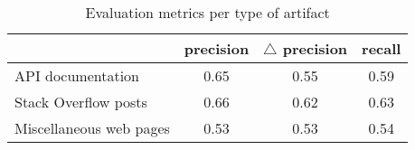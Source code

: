 \begin{table}
\caption{Evaluation metrics per type of artifact}
\label{tbl:comparison-artifact-type-wise}
\centering    
\begin{threeparttable}
\begin{tabular}{lccc}




& \textbf{precision} & $\triangle$ \textbf{precision} & \textbf{recall} \\ 
\hline

API documentation & 0.65 & 0.55 & 0.59
\\

Stack Overflow posts  & 0.66 & 0.62 & 0.63
\\

Miscellaneous web pages & 0.53 & 0.53 & 0.54
\\


\hline
\end{tabular}
\end{threeparttable}
\end{table}
